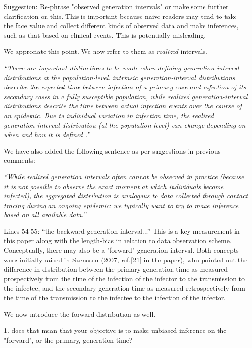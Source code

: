 \documentclass[12pt]{article}
\newcommand{\revtext}{\textsf}
\newcommand{\newtext}[1]{\textsl{``#1''}}
\begin{document}
\revtext{
Suggestion: Re-phrase "observed generation intervals" or make some further
clarification on this. This is important because naive readers may tend
to take the face value and collect different kinds of observed data and
make inferences, such as that based on clinical events. This is potentially
misleading.
}

We appreciate this point. We now refer to them as \emph{realized} intervals.

\newtext{There are important distinctions to be made when defining generation-interval \emph{distributions} at the population-level: \emph{intrinsic} generation-interval distributions describe the expected time between infection of a primary case and infection of its secondary cases in a fully susceptible population,
while \emph{realized} generation-interval distributions describe the time between actual infection events over the course of an epidemic.
Due to individual variation in infection time, the realized generation-interval distribution (at the population-level) can change depending on when and how it is defined \citep{svensson2007note, kenah2008generation, nishiura2010time, champredon2015intrinsic}.}

We have also added the following sentence as per suggestions in previous comments:

\newtext{While realized generation intervals often cannot be observed in practice (because it is not possible to observe the exact moment at which individuals become infected), the aggregated distribution is analogous to data collected through contact tracing during an ongoing epidemic:
we typically want to try to make inference based on all available data.}

\revtext{Lines 54-55: ``the backward generation interval...'' This is a key measurement in this paper along with the length-bias in relation to data observation scheme. Conceptually, there may also be a "forward" generation
interval. Both concepts were initially raised in Svensson (2007, ref.[21]
in the paper), who pointed out the difference in distribution between the
primary generation time as measured prospectively from the time of the
infection of the infector to the transmission to the infectee, and the secondary generation time as measured retrospectively from the time of the
transmission to the infectee to the infection of the infector.}

We now introduce the forward distribution as well.

\revtext{1. does that mean that your objective is to make unbiased inference on the
"forward", or the primary, generation time?}
\end{document}
